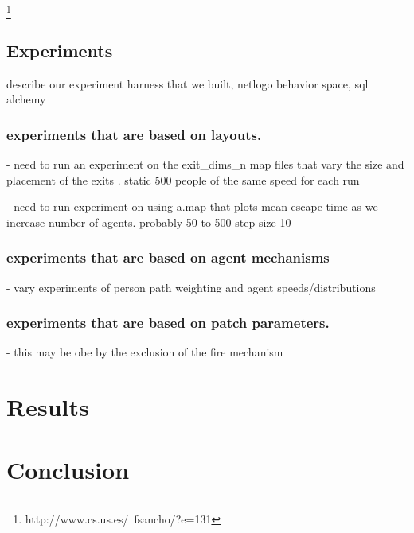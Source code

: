 \documentclass[12pt,letterpaper]{article}
\begin{document}
\cite{mirahmadiNovelAlgorithmRealtime2012}
\footnote{http://www.cs.us.es/~fsancho/?e=131}

\subsection{Experiments}

describe our experiment harness that we built, netlogo behavior space, sql alchemy

\subsubsection{experiments that are based on layouts.}  

- need to run an experiment on the exit\_dims\_n map files that vary the size and placement of the exits . static 500 people of the same speed for each run

- need to run experiment on using a.map that plots mean escape time as we increase number of agents.  probably 50 to 500 step size 10

\subsubsection{experiments that are based on agent mechanisms}

- vary experiments of person path weighting and agent speeds/distributions

\subsubsection{experiments that are based on patch parameters.}

-  this may be obe by the exclusion of the fire mechanism
\section{Results}



\section {Conclusion}



\end{document}
